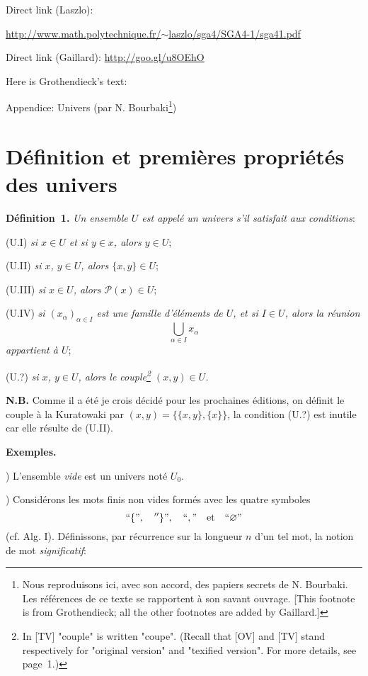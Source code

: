\documentclass[12pt]{article}
\newcommand{\nn}{\noindent}
\begin{document}
\nn Direct link (Laszlo):

\nn\href{http://www.math.polytechnique.fr/~laszlo/sga4/SGA4-1/sga41.pdf}{http://www.math.polytechnique.fr/$\sim$laszlo/sga4/SGA4-1/sga41.pdf}

\nn Direct link (Gaillard): \href{http://goo.gl/u8OEhO}{http://goo.gl/u8OEhO}

Here is Grothendieck's text:

\newpage

{\huge Appendice: Univers (par N. Bourbaki\footnote{Nous reproduisons ici, avec son accord, des papiers secrets de N. Bourbaki. Les références de ce texte se rapportent à son savant ouvrage. [This footnote is from Grothendieck; all the other footnotes are added by Gaillard.]})}

\tableofcontents

\section{Définition et premières propriétés des univers}

\nn\textbf{Définition~1.} \emph{Un ensemble $U$ est appelé un univers s'il satisfait aux conditions}:

\nn(U.I) \emph{si $x\in U$ et si $y\in x$, alors $y\in U$};

\nn(U.II) \emph{si $x$, $y\in U$, alors $\{x,y\}\in U$};

\nn(U.III) \emph{si $x\in U$, alors $\mathcal{P}(x)\in U$};

\nn(U.IV) \emph{si $(x_{\alpha})_{\alpha\in I}$ est une famille d'éléments de $U$, et si $I\in U$, alors la réunion}
$$
\bigcup_{\alpha\in I}x_{\alpha}
$$ 
\emph{appartient à $U$};

\nn(U.?) \emph{si $x$, $y\in U$, alors le couple\footnote{In [TV] "couple" is written "coupe". (Recall that [OV] and [TV] stand respectively for "original version" and "texified version". For more details, see page~1.)} $(x,y)\in U$.}

\nn\textbf{N.B.} Comme il a été je crois décidé pour les prochaines éditions, on définit le couple à la Kuratowaki par $(x,y)=\{\{x,y\}, \{x\}\}$, la condition (U.?) est inutile car elle résulte de (U.II).

\nn\textbf{Exemples.}

\nn1) L'ensemble \emph{vide} est un univers noté $U_0$.

\nn2) Considérons les mots finis non vides formés avec les quatre symboles 
$$
``\{",\quad''\}",\quad``,"\quad\text{et}\quad``\varnothing"
$$ 
(cf. Alg. I). Définissons, par récurrence sur la longueur $n$ d'un tel mot, la notion de mot \emph{significatif}: 
\end{document}
